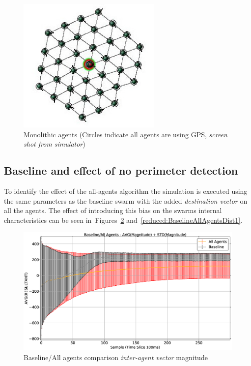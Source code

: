\begin{figure}[H]
\begin{center}
\includegraphics[width=7cm]{CHAPTER-6/figures/Monolithic2}
\end{center}
\caption[Monolithic agents]{Monolithic agents (Circles indicate all agents are using GPS, \textit{screen shot from simulator}) \label{reduced:Monolithic1}}
\end{figure}

\subsection{Baseline and effect of no perimeter detection\label{section:compareBaselineNoPerimeter}}
To identify the effect of the all-agents algorithm the simulation is executed using the same parameters as the baseline swarm with the added \textit{destination vector} on all the agents. The effect of introducing this bias on the swarms internal characteristics can be seen in~Figures~\ref{reduced:BaselineAllAgentsMag1} and~\ref{reduced:BaselineAllAgentsDist1}.
\begin{figure}[H]
\begin{center}
\includegraphics[width=14cm]{CHAPTER-6/figures/BaselineAllAgentsMag1}
\end{center}
\caption{Baseline/All agents comparison \textit{inter-agent vector} magnitude\label{reduced:BaselineAllAgentsMag1}}
\end{figure}

